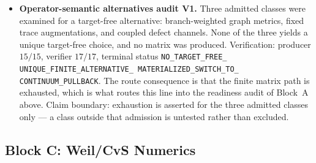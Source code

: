 \documentclass[12pt,a4paper]{article}
\theoremstyle{definition}
\theoremstyle{remark}
\begin{document}
\begin{itemize}
  \item \textbf{Operator-semantic alternatives audit V1.} Three admitted
    classes were examined for a target-free alternative: branch-weighted
    graph metrics, fixed trace augmentations, and coupled defect channels.
    None of the three yields a unique target-free choice, and no matrix was
    produced. Verification: producer $15/15$, verifier $17/17$, terminal
    status \texttt{NO\_\allowbreak TARGET\_\allowbreak FREE\_\allowbreak
    UNIQUE\_\allowbreak FINITE\_\allowbreak ALTERNATIVE\_\allowbreak
    MATERIALIZED\_\allowbreak SWITCH\_\allowbreak TO\_\allowbreak
    CONTINUUM\_\allowbreak PULLBACK}. The route consequence is that the
    finite matrix path is exhausted, which is what routes this line into
    the readiness audit of Block~A above. Claim boundary: exhaustion is
    asserted for the three admitted classes only --- a class outside that
    admission is untested rather than excluded.
\end{itemize}

\subsection{Block C: Weil/CvS Numerics}
\label{sec:v32-block-c}
\end{document}
